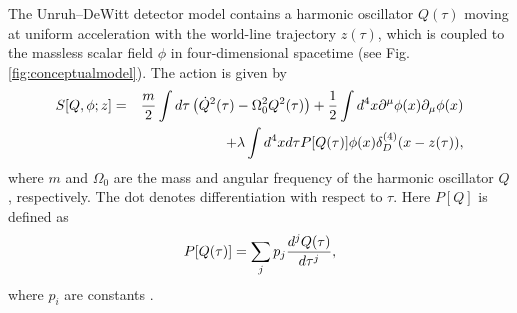 \documentclass[aps,prd,preprintnumbers,nofootinbib,showpacs,11pt]{revtex4}%
\begin{document}
\begin{widetext}
The Unruh--DeWitt detector model contains a harmonic oscillator $Q(\tau)$ moving at uniform acceleration 
with the world-line trajectory $z(\tau)$, which is coupled to the
massless scalar field $\phi$ in four-dimensional spacetime  
(see Fig. \ref{fig:conceptualmodel}).
The action is given by
\begin{eqnarray}  
S[Q,\phi ; z] &=&
\frac{m}{2} \int d \tau \left( \dot{Q}^2(\tau) - \Omega_0^2 Q^2(\tau) \right) 
+ {1\over 2}\int d^4 x \partial^\mu \phi(x) \partial_\mu \phi(x)  
\nonumber \\
&&+ \lambda \int d^4 x d\tau P[Q(\tau)] \phi(x) \delta^{(4)}_D(x-z(\tau)),
\label{actionUD}
\end{eqnarray} 
where $m$ and $\Omega_0$ are the mass and angular frequency 
of the harmonic oscillator $Q$, respectively.
The dot denotes differentiation with respect to $\tau$.
Here $P[Q]$ is defined as 
\begin{eqnarray}
P[Q(\tau)]=\sum_jp_j{d^j Q(\tau)\over d\tau^j},
\label{devPQ}
\end{eqnarray}
where $p_i$ are constants \cite{IYZ2013}. 


\end{widetext}
\end{document}
